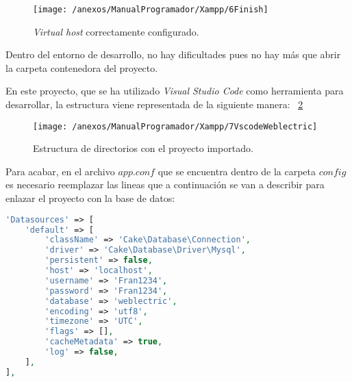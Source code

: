 \begin{figure}[h]
	\centering
	\texttt{[image: /anexos/ManualProgramador/Xampp/6Finish]}
	\caption{\textit{Virtual host} correctamente configurado.}
	\label{img:XAMPP_Finish}
\end{figure}

Dentro del entorno de desarrollo, no hay dificultades pues no hay más que abrir la carpeta contenedora del proyecto.

En este proyecto, que se ha utilizado \textit{Visual Studio Code} como herramienta para desarrollar, la estructura viene representada de la siguiente manera: ~\ref{img:VsCodeWeblectric}

\begin{figure}[h]
	\centering
	\texttt{[image: /anexos/ManualProgramador/Xampp/7VscodeWeblectric]}
	\caption{Estructura de directorios con el proyecto importado.}
	\label{img:VsCodeWeblectric}
\end{figure}

\newpage

Para acabar, en el archivo $app.conf$ que se encuentra dentro de la carpeta $config$ es necesario reemplazar las lineas que a continuación se van a describir para enlazar el proyecto con la base de datos:

\begin{lstlisting}[language=php]
'Datasources' => [
	'default' => [
		'className' => 'Cake\Database\Connection',
		'driver' => 'Cake\Database\Driver\Mysql',
		'persistent' => false,
		'host' => 'localhost',
		'username' => 'Fran1234',
		'password' => 'Fran1234',
		'database' => 'weblectric',
		'encoding' => 'utf8',
		'timezone' => 'UTC',
		'flags' => [],
		'cacheMetadata' => true,
		'log' => false,
	],
],
\end{lstlisting}




